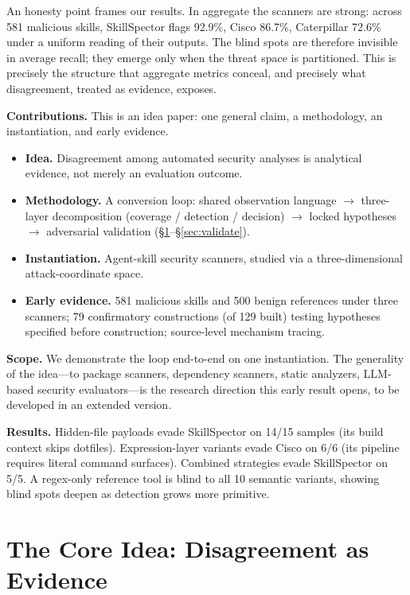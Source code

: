 \documentclass[sigconf,nonacm]{acmart}
\begin{document}
An honesty point frames our results.
In aggregate the scanners are strong: across 581 malicious skills, SkillSpector flags 92.9\%, Cisco 86.7\%, Caterpillar 72.6\% under a uniform reading of their outputs.
The blind spots are therefore invisible in average recall; they emerge only when the threat space is partitioned.
This is precisely the structure that aggregate metrics conceal, and precisely what disagreement, treated as evidence, exposes.

\noindent\textbf{Contributions.} This is an idea paper: one general claim, a methodology, an instantiation, and early evidence.
\begin{itemize}
  \item \textbf{Idea.} Disagreement among automated security analyses is analytical evidence, not merely an evaluation outcome.
  \item \textbf{Methodology.} A conversion loop: shared observation language $\rightarrow$ three-layer decomposition (coverage / detection / decision) $\rightarrow$ locked hypotheses $\rightarrow$ adversarial validation (\S\ref{sec:idea}--\S\ref{sec:validate}).
  \item \textbf{Instantiation.} Agent-skill security scanners, studied via a three-dimensional attack-coordinate space.
  \item \textbf{Early evidence.} 581 malicious skills and 500 benign references under three scanners; 79 confirmatory constructions (of 129 built) testing hypotheses specified before construction; source-level mechanism tracing.
\end{itemize}

\noindent\textbf{Scope.} We demonstrate the loop end-to-end on one instantiation.
The generality of the idea---to package scanners, dependency scanners, static analyzers, LLM-based security evaluators---is the research direction this early result opens, to be developed in an extended version.

\noindent\textbf{Results.} Hidden-file payloads evade SkillSpector on 14/15 samples (its build context skips dotfiles). Expression-layer variants evade Cisco on 6/6 (its pipeline requires literal command surfaces). Combined strategies evade SkillSpector on 5/5.
A regex-only reference tool is blind to all 10 semantic variants, showing blind spots deepen as detection grows more primitive.



\section{The Core Idea: Disagreement as Evidence}
\label{sec:idea}
\end{document}
